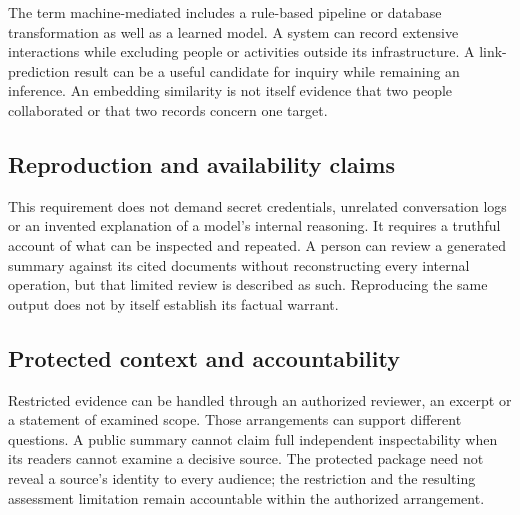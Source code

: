 \documentclass[11pt,a4paper]{article}
\begin{document}
The term machine-mediated includes a rule-based pipeline or database transformation as well as a learned model. A system can record extensive interactions while excluding people or activities outside its infrastructure. A link-prediction result can be a useful candidate for inquiry while remaining an inference. An embedding similarity is not itself evidence that two people collaborated or that two records concern one target.

\subsection{Reproduction and availability claims}

This requirement does not demand secret credentials, unrelated conversation logs or an invented explanation of a model's internal reasoning. It requires a truthful account of what can be inspected and repeated. A person can review a generated summary against its cited documents without reconstructing every internal operation, but that limited review is described as such. Reproducing the same output does not by itself establish its factual warrant.

\subsection{Protected context and accountability}

Restricted evidence can be handled through an authorized reviewer, an excerpt or a statement of examined scope. Those arrangements can support different questions. A public summary cannot claim full independent inspectability when its readers cannot examine a decisive source. The protected package need not reveal a source's identity to every audience; the restriction and the resulting assessment limitation remain accountable within the authorized arrangement.
\end{document}
